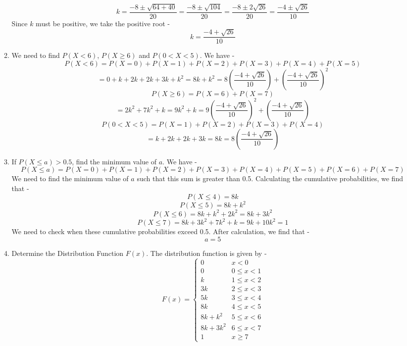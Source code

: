 \begin{enumerate}
\begin{enumerate}
            \[k = \frac{-8 \pm \sqrt{64 + 40}}{20} = \frac{-8 \pm \sqrt{104}}{20} = \frac{-8 \pm 2\sqrt{26}}{20} = \frac{-4 \pm \sqrt{26}}{10}\]
            Since $k$ must be positive, we take the positive root -
            \[\boxed{k = \frac{-4 + \sqrt{26}}{10}
            }\]
        \item We need to find $P(X < 6)$, $P(X \geq 6)$ and $P(0<X<5)$. We have -
            \[P(X < 6) = P(X=0) + P(X=1) + P(X=2) + P(X=3) + P(X=4) + P(X=5)\]
            \[\boxed{= 0 + k + 2k + 2k + 3k + k^2 = 8k + k^2 = 8\left(\frac{-4 + \sqrt{26}}{10}\right) + \left(\frac{-4 + \sqrt{26}}{10}\right)^2
            }\]
            \[P(X \geq 6) = P(X=6) + P(X=7)\]
            \[\boxed{= 2k^2 + 7k^2 + k = 9k^2 + k = 9\left(\frac{-4 + \sqrt{26}}{10}\right)^2 + \left(\frac{-4 + \sqrt{26}}{10}\right)
            }\]
            \[P(0 < X < 5) = P(X=1) + P(X=2) + P(X=3) + P(X=4)\]
            \[\boxed{= k + 2k + 2k + 3k = 8k = 8\left(\frac{-4 + \sqrt{26}}{10}\right)
            }\]
        \item If $P(X\leq a) > 0.5$, find the minimum value of $a$. We have -
            \[P(X \leq a) = P(X=0) + P(X=1) + P(X=2) + P(X=3) + P(X=4) + P(X=5) + P(X=6) + P(X=7)\]
            We need to find the minimum value of $a$ such that this sum is greater than 0.5. 
            Calculating the cumulative probabilities, we find that -
            \[P(X \leq 4) = 8k\]
            \[P(X \leq 5) = 8k + k^2\]
            \[P(X \leq 6) = 8k + k^2 + 2k^2 = 8k + 3k^2\]
            \[P(X \leq 7) = 8k + 3k^2 + 7k^2 + k = 9k + 10k^2 = 1\]
            We need to check when these cumulative probabilities exceed 0.5. 
            After calculation, we find that -
            \[\boxed{a = 5
            }\]
        \item Determine the Distribution Function $F(x)$. The distribution function is given by -
            \[
            F(x) = 
            \begin{cases} 
            0 & x < 0 \\
            0 & 0 \leq x < 1 \\
            k & 1 \leq x < 2 \\
            3k & 2 \leq x < 3 \\
            5k & 3 \leq x < 4 \\
            8k & 4 \leq x < 5 \\
            8k + k^2 & 5 \leq x < 6 \\
            8k + 3k^2 & 6 \leq x < 7 \\
            1 & x \geq 7

\end{cases}\]
\end{enumerate}
\end{enumerate}

